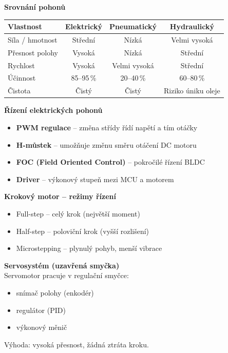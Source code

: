 \documentclass[a4paper,10pt]{article}
\begin{document}
\begin{vysvetlenibox}
\textbf{Srovnání pohonů}

\begin{center}
\begin{tabular}{@{} l c c c @{}}
    \toprule
    \textbf{Vlastnost} & \textbf{Elektrický}
                       & \textbf{Pneumatický} & \textbf{Hydraulický} \\
    \midrule
    Síla / hmotnost & Střední & Nízká & Velmi vysoká \\
    Přesnost polohy & Vysoká & Nízká & Střední \\
    Rychlost        & Vysoká & Velmi vysoká & Střední \\
    Účinnost        & 85--95\,\% & 20--40\,\% & 60--80\,\% \\
    Čistota         & Čistý & Čistý & Riziko úniku oleje \\
    \bottomrule
\end{tabular}

\textbf{Řízení elektrických pohonů}
\begin{itemize}[noitemsep, leftmargin=1.4em, topsep=4pt]
    \item \textbf{PWM regulace} -- změna střídy řídí napětí a tím otáčky
    \item \textbf{H-můstek} -- umožňuje změnu směru otáčení DC motoru
    \item \textbf{FOC (Field Oriented Control)} -- pokročilé řízení BLDC
    \item \textbf{Driver} -- výkonový stupeň mezi MCU a motorem
\end{itemize}

\textbf{Krokový motor -- režimy řízení}
\begin{itemize}[noitemsep, leftmargin=1.4em, topsep=4pt]
    \item Full-step -- celý krok (největší moment)
    \item Half-step -- poloviční krok (vyšší rozlišení)
    \item Microstepping -- plynulý pohyb, menší vibrace
\end{itemize}

\textbf{Servosystém (uzavřená smyčka)}\\
Servomotor pracuje v regulační smyčce:
\begin{itemize}[noitemsep, leftmargin=1.4em, topsep=4pt]
    \item snímač polohy (enkodér)
    \item regulátor (PID)
    \item výkonový měnič
\end{itemize}
Výhoda: vysoká přesnost, žádná ztráta kroku.


\end{center}
\end{vysvetlenibox}
\end{document}
